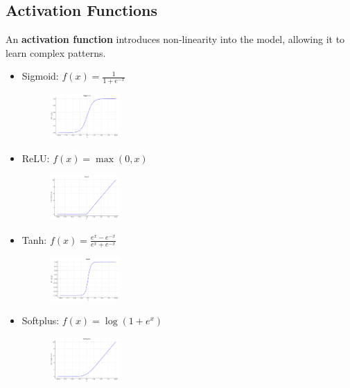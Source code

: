 \subsection*{Activation Functions}
An \textbf{activation function} introduces non-linearity into the model, allowing it to learn complex patterns.
\begin{itemize}
  \item Sigmoid: $f(x) = \frac{1}{1 + e^{-x}}$
    \begin{figure}[H]
      \centering
      \vspace{-1em}
      \includegraphics[width=0.25\textwidth]{images/sigmoid.png}
      \vspace{-2em}
    \end{figure}
  \item ReLU: $f(x) = \max(0, x)$
    \begin{figure}[H]
      \centering
      \vspace{-1em}
      \includegraphics[width=0.25\textwidth]{images/relu.png}
      \vspace{-2em}
    \end{figure}
  \item Tanh: $f(x) = \frac{e^x - e^{-x}}{e^x + e^{-x}}$
    \begin{figure}[H]
      \centering
      \vspace{-1em}
      \includegraphics[width=0.25\textwidth]{images/tanh.png}
      \vspace{-2em}
    \end{figure}
  \item Softplus: $f(x) = \log(1 + e^x)$
    \begin{figure}[H]
      \centering
      \vspace{-1em}
      \includegraphics[width=0.25\textwidth]{images/softplus.png}

\end{figure}
\end{itemize}
